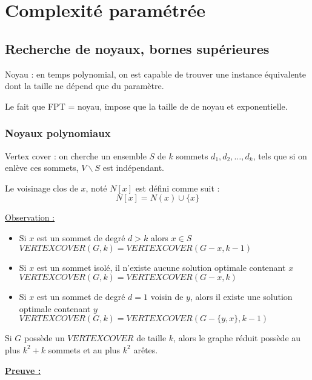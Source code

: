 \documentclass[a4paper, 11pt]{thesis}
\begin{document}
\section{Complexité paramétrée}
\subsection{Recherche de noyaux, bornes supérieures}

Noyau : en temps polynomial, on est capable de trouver une instance équivalente dont la taille ne
dépend que du paramètre.

Le fait que FPT = noyau, impose que la taille de de noyau et exponentielle.


\subsubsection{Noyaux polynomiaux}

Vertex cover : on cherche un ensemble $S$ de $k$ sommets $d_1, d_2, \dots, d_k$, tels que si on enlève
ces sommets, $V \backslash S$ est indépendant.

\begin{df}
    Le voisinage clos de $x$, noté $N[x]$ est défini comme suit : $$
    N[x] = N(x) \cup \{x\} $$
\end{df}

\underline{Observation :}
\begin{itemize}
    \item Si $x$ est un sommet de degré $d > k$ alors $x \in S$
        $VERTEX COVER(G, k) = VERTEX COVER(G - x, k - 1)$
    \item Si $x$ est un sommet isolé, il n'existe aucune solution optimale contenant $x$
        $VERTEX COVER(G, k) = VERTEX COVER (G-x, k)$
    \item Si $x$ est un sommet de degré $d = 1$ voisin de $y$, alors il existe une solution optimale
        contenant $y$
        $VERTEX COVER(G, k) = VERTEX COVER(G - \{y, x\}, k - 1)$
\end{itemize}

\begin{lemma}
    Si $G$ possède un $VERTEX COVER$ de taille $k$, alors le graphe réduit possède au plus $k^2 + k$
    sommets et au plus $k^2$ arêtes.
\end{lemma}

\textbf{\underline{Preuve :}}
\end{document}
